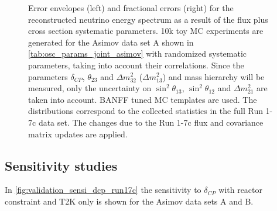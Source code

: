 \begin{figure}[htb]
\caption {
Error envelopes (left) and fractional errors (right) for the reconstructed neutrino energy spectrum
as a result of the flux plus cross section systematic parameters. 
10k toy MC experiments are generated for the Asimov data set A shown in \cref{tab:osc_params_joint_asimov}
with randomized systematic parameters, taking into account their correlations.
Since the parameters $\delta_{CP}$, $\theta_{23}$ and $\Delta m^2_{32}$ ($\Delta m^2_{13}$) and mass hierarchy
will be measured,
only the uncertainty on 
$\sin^2 \theta_{13}$,
$\sin^2 \theta_{12}$
and 
$\Delta m^2_{21}$ 
are taken into account.
BANFF tuned MC templates are used. 
The distributions correspond to the collected statistics in the full Run 1-7c data set.
The changes due to the Run 1-7c flux and covariance matrix updates are applied.
}
\label{fig:flux_xsec_envelope_Asimov_A_run17c}
\end{figure}




\clearpage










%
% 

\subsection{Sensitivity studies}
\label{sec:sensi_run17c}

In \cref{fig:validation_sensi_dcp_run17c} the sensitivity to $\delta_{CP}$ 
with reactor constraint and T2K only is shown for the Asimov data sets A and B.

